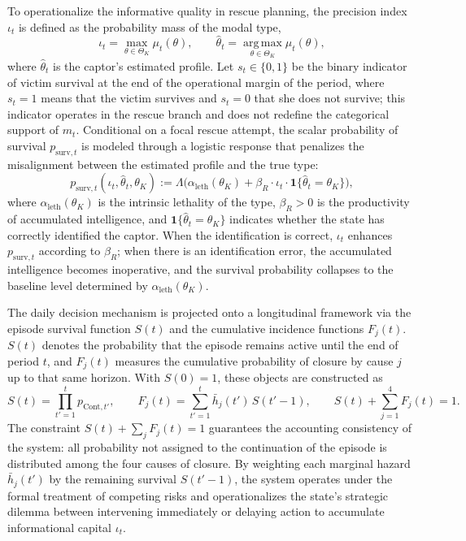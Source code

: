 \documentclass[review,authoryear,12pt]{elsarticle}
\theoremstyle{plain}
\theoremstyle{definition}
\newcommand{\ThetaK}{\Theta_K}
\newcommand{\1}{\mathbf{1}}
\begin{document}
To operationalize the informative quality in rescue planning, the precision index $\iota_t$ is defined as the probability mass of the modal type,
\begin{equation}
\iota_t=\max_{\theta\in\ThetaK}\mu_t(\theta),\qquad\hat{\theta}_t=\operatorname*{arg\,max}_{\theta\in\ThetaK}\mu_t(\theta),
\label{eq:iota}
\end{equation}
where $\hat{\theta}_t$ is the captor's estimated profile. Let $s_t\in\{0,1\}$ be the binary indicator of victim survival at the end of the operational margin of the period, where $s_t=1$ means that the victim survives and $s_t=0$ that she does not survive; this indicator operates in the rescue branch and does not redefine the categorical support of $m_t$. Conditional on a focal rescue attempt, the scalar probability of survival $p_{\mathrm{surv},t}$ is modeled through a logistic response that penalizes the misalignment between the estimated profile and the true type:
\begin{equation}
p_{\mathrm{surv},t}(\iota_t,\hat{\theta}_t,\theta_K):=\Lambda\bigl(\alpha_{\mathrm{leth}}(\theta_K)+\beta_R\cdot\iota_t\cdot\mathbf{1}\{\hat{\theta}_t=\theta_K\}\bigr),
\label{eq:p-surv}
\end{equation}
where $\alpha_{\mathrm{leth}}(\theta_K)$ is the intrinsic lethality of the type, $\beta_R>0$ is the productivity of accumulated intelligence, and $\mathbf{1}\{\hat{\theta}_t=\theta_K\}$ indicates whether the state has correctly identified the captor. When the identification is correct, $\iota_t$ enhances $p_{\mathrm{surv},t}$ according to $\beta_R$; when there is an identification error, the accumulated intelligence becomes inoperative, and the survival probability collapses to the baseline level determined by $\alpha_{\mathrm{leth}}(\theta_K)$.

The daily decision mechanism is projected onto a longitudinal framework via the episode survival function $S(t)$ and the cumulative incidence functions $F_j(t)$. $S(t)$ denotes the probability that the episode remains active until the end of period $t$, and $F_j(t)$ measures the cumulative probability of closure by cause $j$ up to that same horizon. With $S(0)=1$, these objects are constructed as
\begin{equation}
S(t)=\prod_{t'=1}^{t}p_{\mathrm{Cont},t'},\qquad F_j(t)=\sum_{t'=1}^{t}\bar h_j(t')\,S(t'-1),\qquad S(t)+\sum_{j=1}^{4}F_j(t)=1.
\label{eq:longitudinal}
\end{equation}
The constraint $S(t)+\sum_j F_j(t)=1$ guarantees the accounting consistency of the system: all probability not assigned to the continuation of the episode is distributed among the four causes of closure. By weighting each marginal hazard $\bar h_j(t')$ by the remaining survival $S(t'-1)$, the system operates under the formal treatment of competing risks and operationalizes the state's strategic dilemma between intervening immediately or delaying action to accumulate informational capital $\iota_t$.
\end{document}
